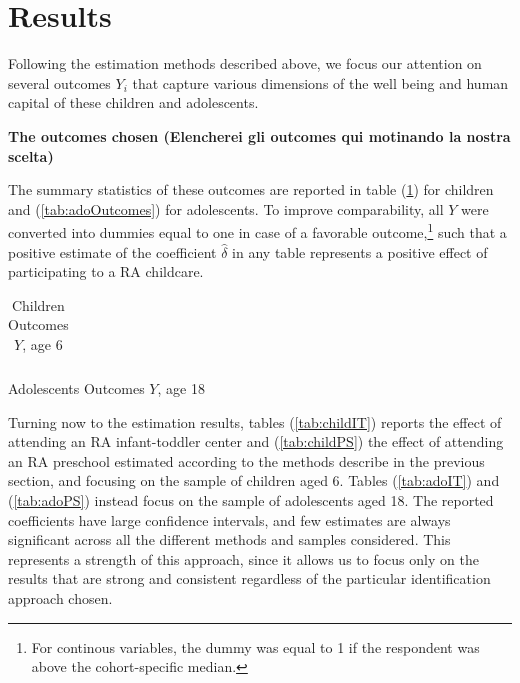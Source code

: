 \documentclass[12pt]{article}
\begin{document}

\section{Results}

Following the estimation methods described above, we focus our attention on several outcomes $Y_{i}$ that capture various dimensions of the well being and human capital of these children and adolescents. 

\textbf{The outcomes chosen (Elencherei gli outcomes qui motinando la nostra
scelta)}



The summary statistics of these outcomes are reported in table (\ref{tab:childOutcomes}) for children and (\ref{tab:adoOutcomes}) for adolescents. To improve comparability, all $Y$ were converted into dummies equal to one in case of a favorable outcome,\footnote{For continous variables, the dummy was equal to 1 if the respondent was above the cohort-specific median.} such that a positive estimate of the coefficient $\hat{\delta}$ in any table represents a positive effect of participating to a RA childcare.

\begin{table}[ht]
\caption{Children Outcomes $Y$, age 6}
\label{tab:childOutcomes}
\begin{center}
\begin{tabular}{ccc}
\hline\hline
\end{tabular}
\end{center}
\end{table}

\begin{table}[ht]
\caption{Adolescents Outcomes $Y$, age 18}
\label{tab:adoOutcomes}
\end{table}

Turning now to the estimation results, tables (\ref{tab:childIT}) reports the effect of attending an RA infant-toddler center and (\ref{tab:childPS}) the effect of attending an RA preschool estimated according to the methods describe in the previous section, and focusing on the sample of children aged 6. Tables (\ref{tab:adoIT}) and (\ref{tab:adoPS}) instead focus on the sample of adolescents aged 18.
The reported coefficients have large confidence intervals, and few estimates are always significant across all the different methods and samples considered. This represents a strength of this approach, since it allows us to focus only on the results that are strong and consistent regardless of the particular identification approach chosen.
\end{document}
